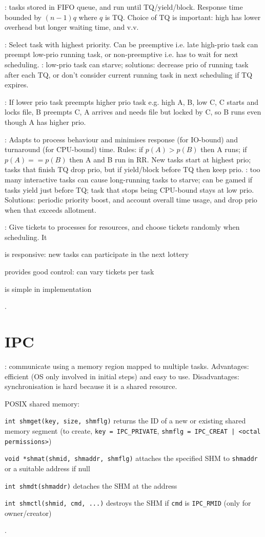 \documentclass[fontsize=9pt]{slnotes}
\newcommand\problems{\textsymbol{✗}}
\begin{document}
: tasks stored in FIFO queue, and run until TQ/yield/block. Response time bounded by \((n-1)q\) where \(q\) is TQ. Choice of TQ is important: high has lower overhead but longer waiting time, and v.v.

: Select task with highest priority. Can be preemptive i.e. late high-prio task can preempt low-prio running task, or non-preemptive i.e. has to wait for next scheduling. \problems: low-prio task can starve; solutions: decrease prio of running task after each TQ, or don't consider current running task in next scheduling if TQ expires.

: If lower prio task preempts higher prio task e.g. high A, B, low C, C starts and locks file, B preempts C, A arrives and needs file but locked by C, so B runs even though A has higher prio.

: Adapts to process behaviour and minimises response (for IO-bound) and turnaround (for CPU-bound) time. Rules: if \(p(A) > p(B)\) then A runs; if \(p(A) == p(B)\) then A and B run in RR. New tasks start at highest prio; tasks that finish TQ drop prio, but if yield/block before TQ then keep prio. \problems: too many interactive tasks can cause long-running tasks to starve; can be gamed if tasks yield just before TQ; task that stops being CPU-bound stays at low prio. Solutions: periodic priority boost, and account overall time usage, and drop prio when that exceeds allotment.

: Give tickets to processes for resources, and choose tickets randomly when scheduling. It \begin{slinenum}
\item is responsive: new tasks can participate in the next lottery
\item provides good control: can vary tickets per task
\item is simple in implementation
\end{slinenum}.

\chapter{IPC}
: communicate using a memory region mapped to multiple tasks. Advantages: efficient (OS only involved in initial steps) and easy to use. Disadvantages: synchronisation is hard because it is a shared resource.

POSIX shared memory: \begin{slinenum}
\item \texttt{int shmget(key, size, shmflg)} returns the ID of a new or existing shared memory segment (to create, \texttt{key = IPC\_PRIVATE}, \texttt{shmflg = IPC\_CREAT | <octal permissions>})
\item \texttt{void *shmat(shmid, shmaddr, shmflg)} attaches the specified SHM to \texttt{shmaddr} or a suitable address if null
\item \texttt{int shmdt(shmaddr)} detaches the SHM at the address
\item \texttt{int shmctl(shmid, cmd, ...)} destroys the SHM if \texttt{cmd} is \texttt{IPC\_RMID} (only for owner/creator)
\end{slinenum}.
\end{document}
